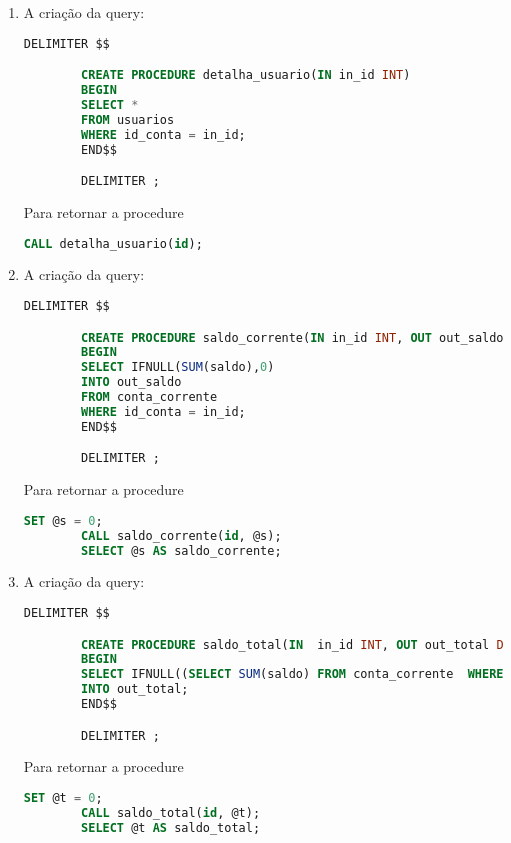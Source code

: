\documentclass{article}
\begin{document}
\begin{enumerate}[label=\alph*)]
    \item A criação da query:
    \begin{lstlisting}[language=SQL]
        DELIMITER $$

        CREATE PROCEDURE detalha_usuario(IN in_id INT)
        BEGIN
        SELECT *
        FROM usuarios
        WHERE id_conta = in_id;
        END$$

        DELIMITER ;
    \end{lstlisting}

    Para retornar a procedure
    \begin{lstlisting}[language=SQL]
        CALL detalha_usuario(id);
    \end{lstlisting}

    \item A criação da query:
    \begin{lstlisting}[language=SQL]
        DELIMITER $$

        CREATE PROCEDURE saldo_corrente(IN in_id INT, OUT out_saldo DECIMAL(10,2))
        BEGIN
        SELECT IFNULL(SUM(saldo),0)
        INTO out_saldo
        FROM conta_corrente
        WHERE id_conta = in_id;
        END$$

        DELIMITER ;
    \end{lstlisting}

    Para retornar a procedure

    \begin{lstlisting}[language=SQL]
        SET @s = 0;
        CALL saldo_corrente(id, @s);
        SELECT @s AS saldo_corrente;
    \end{lstlisting}

    \item A criação da query:
    \begin{lstlisting}[language=SQL]
        DELIMITER $$

        CREATE PROCEDURE saldo_total(IN  in_id INT, OUT out_total DECIMAL(10,2))
        BEGIN
        SELECT IFNULL((SELECT SUM(saldo) FROM conta_corrente  WHERE id_conta = in_id),0) + IFNULL((SELECT SUM(saldo) FROM conta_poupanca WHERE id_conta = in_id),0)
        INTO out_total;
        END$$

        DELIMITER ;
    \end{lstlisting}

    Para retornar a procedure

    \begin{lstlisting}[language=SQL]
        SET @t = 0;
        CALL saldo_total(id, @t);
        SELECT @t AS saldo_total;
    \end{lstlisting}


\end{enumerate}
\end{document}
